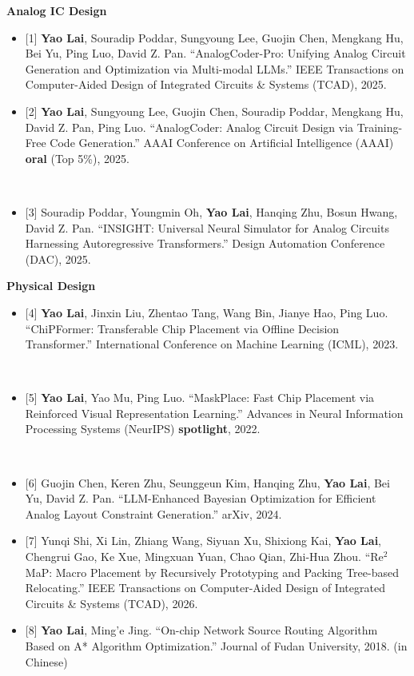 \documentclass{article}
\newcommand{\resumeItemListStart}{\begin{itemize}[topsep=2pt]}
\newcommand{\resumeItemListEnd}{\end{itemize}\vspace{-5pt}}
\newif\ifshowCCF
\newcommand{\ccf}[1]{%
  \ifshowCCF
    \ifnum\pdfstrcmp{#1}{A}=0
      \resumetag{\textbf{CCF-#1}}%
    \else
      \resumetaggray{\textbf{CCF-#1}}%
    \fi
  \fi
}
\begin{document}
    \item{\textbf{Analog IC Design}}
    \resumeItemListStart
      \item{[1] \textbf{Yao Lai}, Souradip Poddar, Sungyoung Lee, Guojin Chen, Mengkang Hu, Bei Yu, Ping Luo, David Z. Pan. ``AnalogCoder-Pro: Unifying Analog Circuit Generation and Optimization via Multi-modal LLMs.'' IEEE Transactions on Computer-Aided Design of Integrated Circuits \& Systems (TCAD), 2025. \ccf{A}}
      \item{[2] \textbf{Yao Lai}, Sungyoung Lee, Guojin Chen, Souradip Poddar, Mengkang Hu, David Z. Pan, Ping Luo. ``AnalogCoder: Analog Circuit Design via Training-Free Code Generation.'' AAAI Conference on Artificial Intelligence (AAAI) \textbf{oral} (Top 5\%), 2025. \ccf{A}~~}
      \item{[3] Souradip Poddar, Youngmin Oh, \textbf{Yao Lai}, Hanqing Zhu, Bosun Hwang, David Z. Pan. ``INSIGHT: Universal Neural Simulator for Analog Circuits Harnessing Autoregressive Transformers.'' Design Automation Conference (DAC), 2025. \ccf{A}}
    \resumeItemListEnd

    \vspace{3pt}
    \item{\textbf{Physical Design}}
    \resumeItemListStart
      \item{[4] \textbf{Yao Lai}, Jinxin Liu, Zhentao Tang, Wang Bin, Jianye Hao, Ping Luo. ``ChiPFormer: Transferable Chip Placement via Offline Decision Transformer.'' International Conference on Machine Learning (ICML), 2023. \ccf{A}~}
      \item{[5] \textbf{Yao Lai}, Yao Mu, Ping Luo. ``MaskPlace: Fast Chip Placement via Reinforced Visual Representation Learning.'' Advances in Neural Information Processing Systems (NeurIPS) \textbf{spotlight}, 2022. \ccf{A}~}
      \item{[6] Guojin Chen, Keren Zhu, Seunggeun Kim, Hanqing Zhu, \textbf{Yao Lai}, Bei Yu, David Z. Pan. ``LLM-Enhanced Bayesian Optimization for Efficient Analog Layout Constraint Generation.'' arXiv, 2024.}
      \item{[7] Yunqi Shi, Xi Lin, Zhiang Wang, Siyuan Xu, Shixiong Kai, \textbf{Yao Lai}, Chengrui Gao, Ke Xue, Mingxuan Yuan, Chao Qian, Zhi-Hua Zhou. ``Re$^{\text{2}}$MaP: Macro Placement by Recursively Prototyping and Packing Tree-based Relocating.'' IEEE Transactions on Computer-Aided Design of Integrated Circuits \& Systems (TCAD), 2026. \ccf{A}}
      \item{[8] \textbf{Yao Lai}, Ming'e Jing. ``On-chip Network Source Routing Algorithm Based on A* Algorithm Optimization.'' Journal of Fudan University, 2018. (in Chinese)}
    \resumeItemListEnd
\end{document}
